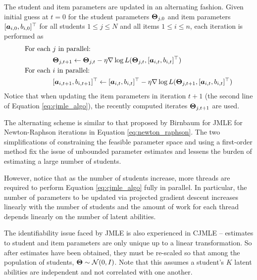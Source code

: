 The student and item parameters are updated in an alternating fashion. Given initial guess at $t=0$ for the student parameters $\boldsymbol{\Theta}_{j,0}$ and item parameters $[\boldsymbol{a}_{i,0}, b_{i,0}]^\top$ for all students $1\leq j \leq N$ and all items $1\leq i \leq n$, each iteration is performed as
\begin{equation}
\begin{split}
  \text{For each } &j \text{ in parallel:} \\
  &\boldsymbol{\Theta}_{j,t+1} \gets \boldsymbol{\Theta}_{j,t} - \eta \nabla \log L(\boldsymbol{\Theta}_{j,t}, [\boldsymbol{a}_{i,t}, b_{i,t}]^\top) \\
  \text{For each } &i \text{ in parallel:} \\
  &[\boldsymbol{a}_{i,t+1}, b_{i,t+1}]^\top \gets [\boldsymbol{a}_{i,t}, b_{i,t}]^\top - \eta \nabla \log L(\boldsymbol{\Theta}_{j,t+1}, [\boldsymbol{a}_{i,t}, b_{i,t}]^\top)
\end{split}
  \label{eq:cjmle_algo}
\end{equation}
Notice that when updating the item parameters in iteration $t+1$ (the second line of Equation \ref{eq:cjmle_algo}), the recently computed iterates $\boldsymbol{\Theta}_{j,t+1}$ are used.

The alternating scheme is similar to that proposed by Birnbaum \cite{birnbaum1968} for JMLE for Newton-Raphson iterations in Equation \ref{eq:newton_raphson}. The two simplifications of constraining the feasible parameter space and using a first-order method fix the issue of unbounded parameter estimates and lessens the burden of estimating a large number of students.

However, notice that as the number of students increase, more threads are required to perform Equation \ref{eq:cjmle_algo} fully in parallel. In particular, the number of parameters to be updated via projected gradient descent increases linearly with the number of students and the amount of work for each thread depends linearly on the number of latent abilities.

The identifiability issue faced by JMLE is also experienced in CJMLE -- estimates to student and item parameters are only unique up to a linear transformation. So after estimates have been obtained, they must be re-scaled so that among the population of students, $\boldsymbol{\Theta} \sim \mathcal{N}(0,I)$. Note that this assumes a student's $K$ latent abilities are independent and not correlated with one another.


